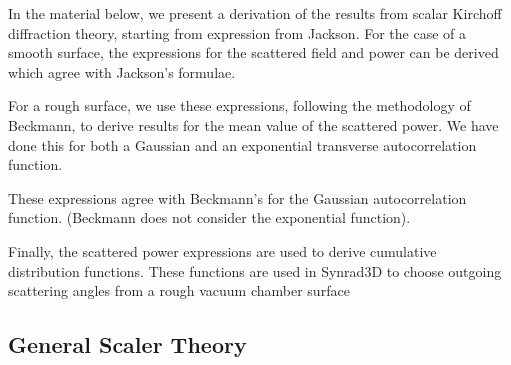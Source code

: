 \documentclass[11pt]{article}
\begin{document}
{{{{In the material below, we present a derivation of the results from
scalar Kirchoff diffraction theory, starting from expression from
Jackson. For the case of a smooth surface, the expressions for the
scattered field and power can be derived which agree with Jackson's
formulae.

For a rough surface, we use these expressions, following the
methodology of Beckmann, to derive results for the mean value of the
scattered power. We have done this for both a Gaussian and an
exponential transverse autocorrelation function.

These expressions agree with Beckmann's for the Gaussian
autocorrelation function. (Beckmann does not consider the exponential
function).

Finally, the scattered power expressions are used to derive cumulative
distribution functions. These functions are used in Synrad3D to choose
outgoing scattering angles from a rough vacuum chamber surface

\subsection{General Scaler Theory} 

}}}}
\end{document}
